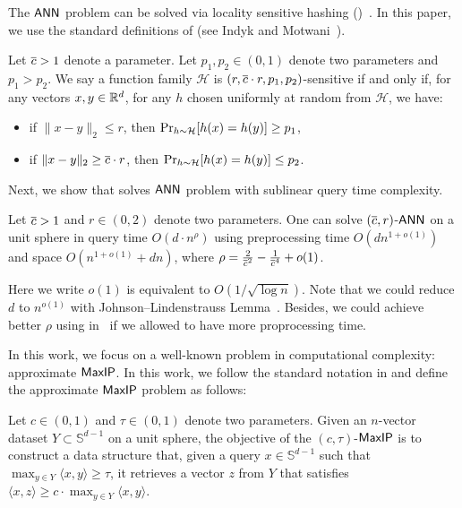 The $\mathsf{ANN}$ problem can be solved via locality sensitive hashing ({\lsh})~\cite{im98,diim04,iw18}. In this paper, we use the standard definitions of {\lsh} (see Indyk and Motwani~\cite{im98}).
\begin{definition}
Let $\overline{c}>1$ denote a parameter. Let $p_1, p_2\in (0,1)$ denote two parameters and $p_1 > p_2 $. We say a function family $\mathcal{H}$ is $(r,\overline{c} \cdot r,p_1,p_2)$-sensitive if and only if, for any vectors $x,y \in \mathbb{R}^d$, for any $h$ chosen uniformly at random from $\mathcal{H}$, we have:
\begin{itemize}
    \item if $\| x-y\|_2 \leq r$, then $\Pr_{h\sim {\cal H}} [ h(x)=h(y) ] \geq p_1$,
    \item if $ \|x-y\|_2 \geq \overline{c} \cdot r$, then $\Pr_{h\sim {\cal H}} [ h(x)=h(y) ] \leq p_2$.
\end{itemize}
\end{definition}


Next, we show that {\lsh} solves $\mathsf{ANN}$ problem with sublinear query time complexity.



\begin{theorem}\label{thm:ar17:formal}
Let $\overline{c} > 1$ and $r \in (0,2)$ denote two parameters. One can solve $(\overline{c},r)$-$\mathsf{ANN}$ on a unit sphere in query time $O(d \cdot n^{\rho})$ using preprocessing time $O(dn^{1+o(1)})$ and space $O(n^{1+o(1)} + d n)$, where $\rho = \frac{2}{\overline{c}^2} -\frac{1}{\overline{c}^4}+o(1)$.
\end{theorem}
Here we write $o(1)$ is equivalent to $O(1/\sqrt{\log n})$. Note that we could reduce $d$ to $n^{o(1)}$ with Johnson–Lindenstrauss Lemma~\cite{jl84}. Besides, we could achieve better $\rho$ using {\lsh} in~\cite{ar15} if we allowed to have more proprocessing time. 



In this work, we focus on a well-known problem in computational complexity: approximate $\mathsf{MaxIP}$. In this work, we follow the standard notation in \cite{c18} and define the approximate $\mathsf{MaxIP}$ problem as follows:


\begin{definition}\label{def:approximate_maxip}
Let $c \in (0,1)$ and $\tau \in (0,1)$ denote two parameters.
Given an $n$-vector dataset $Y \subset \mathbb{S}^{d-1}$ on a unit sphere, the objective of the $(c,\tau)$-{$\mathsf{MaxIP}$} is to construct a data structure that, given a query $x \in \mathbb{S}^{d-1}$ such that $\max_{y\in Y}\langle x , y \rangle \geq \tau$, it retrieves a vector $z$ from $Y$ that satisfies $\langle x , z \rangle \geq c \cdot \max_{y \in Y} \langle x,y \rangle$.
\end{definition}


